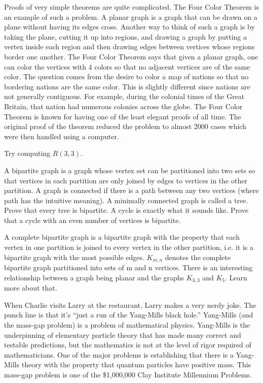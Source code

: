 Proofs of very simple theorems are quite complicated. The Four Color Theorem is an example of such a problem. A planar graph is a graph that can be drawn on a plane without having its edges cross. Another way to think of such a graph is by taking the plane, cutting it up into regions, and drawing a graph by putting a vertex inside each region and then drawing edges between vertices whose regions border one another. The Four Color Theorem says that given a planar graph, one can color the vertices with 4 colors so that no adjacent vertices are of the same color. The question comes from the desire to color a map of nations so that no bordering nations are the same color. This is slightly different since nations are not generally contiguous. For example, during the colonial times of the Great Britain, that nation had numerous colonies across the globe. The Four Color Theorem is known for having one of the least elegant proofs of all time. The original proof of the theorem reduced the problem to almost 2000 cases which were then handled using a computer.


Try computing $R(3,3)$.


A bipartite graph is a graph whose vertex set can be partitioned into two sets so that vertices in each partition are only joined by edges to vertices in the other partition. A graph is connected if there is a path between any two vertices (where path has the intuitive meaning). A minimally connected graph is called a tree.  Prove that every tree is bipartite.  A cycle is exactly what it sounds like. Prove that a cycle with an even number of vertices is bipartite.


A complete bipartite graph is a bipartite graph with the property that each vertex in one partition is joined to every vertex in the other partition, i.e. it is a bipartite graph with the most possible edges. $K_{m,n}$ denotes the complete bipartite graph partitioned into sets of m and n vertices. There is an interesting relationship between a graph being planar and the graphs $K_{3,3}$ and $K_5$. Learn more about that.



When Charlie visits Larry at the restaurant, Larry makes a very nerdy joke. The punch line is that it's ``just a run of the Yang-Mills black hole.'' Yang-Mills (and the mass-gap problem) is a problem of mathematical physics. Yang-Mills is the underpinning of elementary particle theory that has made many correct and testable predictions, but the mathematics is not at the level of rigor required of mathematicians. One of the major problems is establishing that there is a Yang-Mills theory with the property that quantum particles have positive mass. This mass-gap problem is one of the \$1,000,000 Clay Institute Millennium Problems.